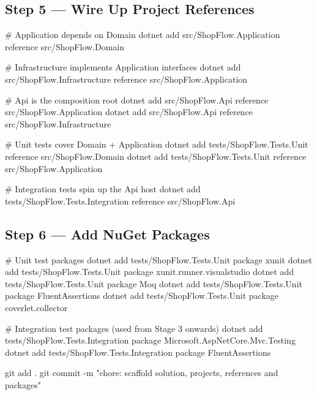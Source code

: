 \documentclass[11pt,a4paper]{article}
\begin{document}
\subsection{Step 5 --- Wire Up Project References}

\begin{codeframe}
\begin{codeblock}
# Application depends on Domain
dotnet add src/ShopFlow.Application    reference src/ShopFlow.Domain

# Infrastructure implements Application interfaces
dotnet add src/ShopFlow.Infrastructure reference src/ShopFlow.Application

# Api is the composition root
dotnet add src/ShopFlow.Api            reference src/ShopFlow.Application
dotnet add src/ShopFlow.Api            reference src/ShopFlow.Infrastructure

# Unit tests cover Domain + Application
dotnet add tests/ShopFlow.Tests.Unit   reference src/ShopFlow.Domain
dotnet add tests/ShopFlow.Tests.Unit   reference src/ShopFlow.Application

# Integration tests spin up the Api host
dotnet add tests/ShopFlow.Tests.Integration reference src/ShopFlow.Api
\end{codeblock}
\end{codeframe}

\subsection{Step 6 --- Add NuGet Packages}

\begin{codeframe}
\begin{codeblock}
# Unit test packages
dotnet add tests/ShopFlow.Tests.Unit package xunit
dotnet add tests/ShopFlow.Tests.Unit package xunit.runner.visualstudio
dotnet add tests/ShopFlow.Tests.Unit package Moq
dotnet add tests/ShopFlow.Tests.Unit package FluentAssertions
dotnet add tests/ShopFlow.Tests.Unit package coverlet.collector

# Integration test packages (used from Stage 3 onwards)
dotnet add tests/ShopFlow.Tests.Integration package Microsoft.AspNetCore.Mvc.Testing
dotnet add tests/ShopFlow.Tests.Integration package FluentAssertions

git add .
git commit -m "chore: scaffold solution, projects, references and packages"
\end{codeblock}
\end{codeframe}
\end{document}
